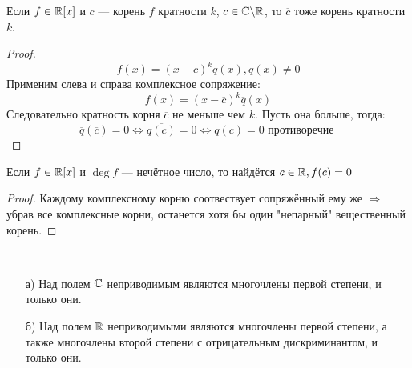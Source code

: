 \begin{note}
  Если $f \in \mathbb{R}[x]$ и $c$ --- корень $f$ кратности $k$, $c \in \mathbb{C} \backslash \mathbb{R}$, то $\overline{c}$ тоже корень кратности $k$.
\end{note}
\begin{proof}
  \[
  f(x) = (x - c)^{k}q(x), q(x) \neq 0
  \]
  Применим слева и справа комплексное сопряжение:
  \[
  f(x) = (x - \overline{c})^{k} \overline{q}(x)
  \]
  Следовательно кратность корня $\overline{c}$ не меньше чем $k$. Пусть она больше, тогда:
  \[
  \overline{q}(\overline{c}) = 0 \iff \overline{q(c)} = 0 \iff q(c) = 0 \text{ противоречие }
  \]
\end{proof}
\begin{consequence}
  \label{consequence:02_OTA_5}
  Если $f \in \mathbb{R}[x]$ и $\deg f$ --- нечётное число, то найдётся $c \in \mathbb{R}, f(c) = 0$
\end{consequence}
\begin{proof}
  Каждому комплексному корню соотвествует сопряжённый ему же $\Rightarrow$ убрав все комплексные корни, останется хотя бы один "непарный" вещественный корень.
\end{proof}
\begin{consequence}
  \label {consequence:02_OTA_6}
  ~\newline
  \begin{itemize}
    \item [а) ] Над полем $\mathbb{C}$ неприводимым являются многочлены первой степени, и только они.
    \item [б) ] Над полем $\mathbb{R}$ неприводимыми являются многочлены первой степени, а также многочлены второй степени с отрицательным дискриминантом, и только они.
  \end{itemize}
\end{consequence}
